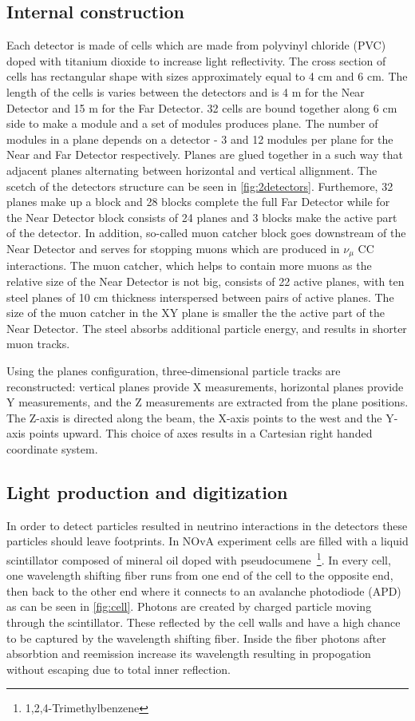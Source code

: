 \subsection{Internal construction}
Each detector is made of cells which are made from polyvinyl chloride (PVC) doped with titanium 
dioxide to increase light reflectivity. The cross section of cells has rectangular shape with sizes
approximately equal to 4 cm and 6 cm. The length of the cells is varies between the detectors and 
is 4 m for the Near Detector and 15 m for the Far Detector. 32 cells are bound together along
6 cm side to make a module and a set of modules produces plane. The number of modules in a plane
depends on a detector - 3 and 12 modules per plane for the Near and Far Detector respectively. Planes
are glued together in a such way that adjacent planes alternating between horizontal and vertical
allignment. The scetch of the detectors structure can be seen in \ref{fig:2detectors}. Furthemore, 32 planes 
make up a block and 28 blocks complete the full Far Detector while for the Near Detector block consists
of 24 planes and 3 blocks make the active part of the detector. In addition, so-called muon catcher
block goes downstream of the Near Detector and serves for stopping muons which are produced in $\nu_\mu$ 
CC interactions. The muon catcher, which helps to contain more muons as the relative size of the Near 
Detector is not big, consists of 22 active planes, with ten steel planes of 10 cm thickness interspersed 
between pairs of active planes. The size of the muon catcher in the XY plane is smaller the the active 
part of the Near Detector. The steel absorbs additional particle energy, and results in shorter muon tracks.

Using the planes configuration, three-dimensional particle tracks are reconstructed: vertical planes
provide X measurements, horizontal planes provide Y measurements, and the Z measurements are extracted from
the plane positions. The Z-axis is directed along the beam, the X-axis points to the west and the Y-axis points
upward. This choice of axes results in a Cartesian right handed coordinate system.

\subsection{Light production and digitization}
In order to detect particles resulted in neutrino interactions in the detectors these particles 
should leave footprints. In NOvA experiment cells are filled with a liquid scintillator composed 
of mineral oil doped with pseudocumene~\footnote{1,2,4-Trimethylbenzene}. In every cell, one wavelength 
shifting fiber runs from one end of the cell to the opposite end, then back to the other end where 
it connects to an avalanche photodiode (APD) as can be seen in \ref{fig:cell}. Photons are created by charged 
particle moving through the scintillator. These reflected by the cell walls and have a high chance 
to be captured by the wavelength shifting fiber. Inside the fiber photons after absorbtion and
reemission increase its wavelength resulting in propogation without escaping due to total inner
reflection. 

